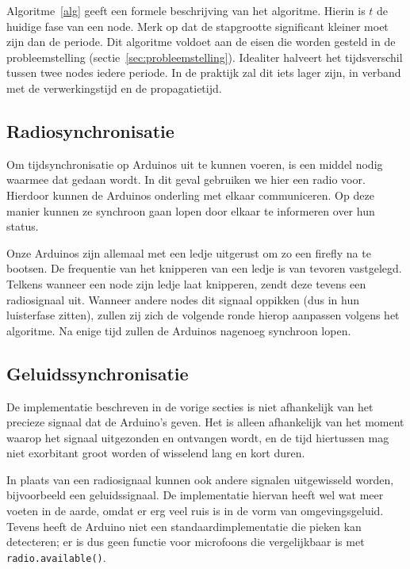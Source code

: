 \documentclass[a4paper,10pt]{article}
\begin{document}
Algoritme~\ref{alg} geeft een formele beschrijving van het algoritme. Hierin is $t$ de huidige fase van een node. Merk op dat de stapgrootte significant kleiner moet zijn dan de periode. Dit algoritme voldoet aan de eisen die worden gesteld in de probleemstelling (sectie~\ref{sec:probleemstelling}). Idealiter halveert het tijdsverschil tussen twee nodes iedere periode. In de praktijk zal dit iets lager zijn, in verband met de verwerkingstijd en de propagatietijd.

\subsection{Radiosynchronisatie}\label{sec:radiosync}
Om tijdsynchronisatie op Arduinos uit te kunnen voeren, is een middel nodig waarmee dat gedaan wordt. In dit geval gebruiken we hier een radio voor. Hierdoor kunnen de Arduinos onderling met elkaar communiceren. Op deze manier kunnen ze synchroon gaan lopen door elkaar te informeren over hun status.

Onze Arduinos zijn allemaal met een ledje uitgerust om zo een firefly na te bootsen. De frequentie van het knipperen van een ledje is van tevoren vastgelegd. Telkens wanneer een node zijn ledje laat knipperen, zendt deze tevens een radiosignaal uit. Wanneer andere nodes dit signaal oppikken (dus in hun luisterfase zitten), zullen zij zich de volgende ronde hierop aanpassen volgens het algoritme. Na enige tijd zullen de Arduinos nagenoeg synchroon lopen.

\subsection{Geluidssynchronisatie}\label{sec:geluidssec}
De implementatie beschreven in de vorige secties is niet afhankelijk van het precieze signaal dat de Arduino's geven. Het is alleen afhankelijk van het moment waarop het signaal uitgezonden en ontvangen wordt, en de tijd hiertussen mag niet exorbitant groot worden of wisselend lang en kort duren.

In plaats van een radiosignaal kunnen ook andere signalen uitgewisseld worden, bijvoorbeeld een geluidssignaal. De implementatie hiervan heeft wel wat meer voeten in de aarde, omdat er erg veel ruis is in de vorm van omgevingsgeluid. Tevens heeft de Arduino niet een standaardimplementatie die pieken kan detecteren; er is dus geen functie voor microfoons die vergelijkbaar is met \texttt{radio.available()}.
\end{document}
